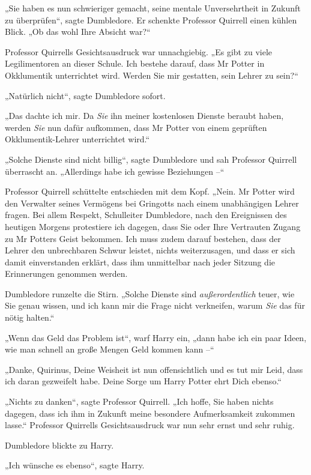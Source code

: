 {„Sie haben es nun schwieriger gemacht, seine mentale Unversehrtheit in Zukunft zu überprüfen“, sagte Dumbledore. Er schenkte Professor Quirrell einen kühlen Blick. „Ob das wohl Ihre Absicht war?“

Professor Quirrells Gesichtsausdruck war unnachgiebig. „Es gibt zu viele Legilimentoren an dieser Schule. Ich bestehe darauf, dass Mr Potter in Okklumentik unterrichtet wird. Werden Sie mir gestatten, sein Lehrer zu sein?“

„Natürlich nicht“, sagte Dumbledore sofort.

„Das dachte ich mir. Da \emph{Sie} ihn meiner kostenlosen Dienste beraubt haben, werden \emph{Sie} nun dafür aufkommen, dass Mr Potter von einem geprüften Okklumentik-Lehrer unterrichtet wird.“

„Solche Dienste sind nicht billig“, sagte Dumbledore und sah Professor Quirrell überrascht an. „Allerdings habe ich gewisse Beziehungen --“

Professor Quirrell schüttelte entschieden mit dem Kopf. „Nein. Mr Potter wird den Verwalter seines Vermögens bei Gringotts nach einem unabhängigen Lehrer fragen. Bei allem Respekt, Schulleiter Dumbledore, nach den Ereignissen des heutigen Morgens protestiere ich dagegen, dass Sie oder Ihre Vertrauten Zugang zu Mr Potters Geist bekommen. Ich muss zudem darauf bestehen, dass der Lehrer den unbrechbaren Schwur leistet, nichts weiterzusagen, und dass er sich damit einverstanden erklärt, dass ihm unmittelbar nach jeder Sitzung die Erinnerungen genommen werden.

Dumbledore runzelte die Stirn. „Solche Dienste sind \emph{außerordentlich} teuer, wie Sie genau wissen, und ich kann mir die Frage nicht verkneifen, warum \emph{Sie} das für nötig halten.“

„Wenn das Geld das Problem ist“, warf Harry ein, „dann habe ich ein paar Ideen, wie man schnell an große Mengen Geld kommen kann --“

„Danke, Quirinus, Deine Weisheit ist nun offensichtlich und es tut mir Leid, dass ich daran gezweifelt habe. Deine Sorge um Harry Potter ehrt Dich ebenso.“

„Nichts zu danken“, sagte Professor Quirrell. „Ich hoffe, Sie haben nichts dagegen, dass ich ihm in Zukunft meine besondere Aufmerksamkeit zukommen lasse.“ Professor Quirrells Gesichtsausdruck war nun sehr ernst und sehr ruhig.

Dumbledore blickte zu Harry.

„Ich wünsche es ebenso“, sagte Harry.

}
